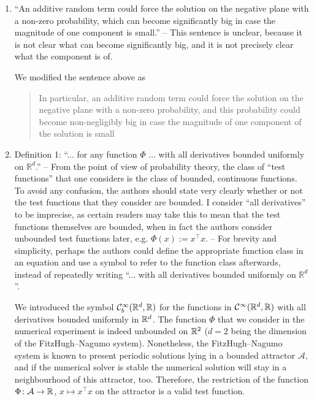 \documentclass[10pt]{article}
\begin{document}
\begin{enumerate}
	\item 
	\begin{itquote} 
		{\normalfont [Page 3]} ``An additive random term could force the solution on the negative plane with a non-zero probability, which can become significantly big in case the magnitude of one component is small.'' -- This sentence is unclear, because it is not clear what can become significantly big, and it is not precisely clear what the component is of.
	\end{itquote}
	We modified the sentence above as 
	\begin{quote} In particular, an additive random term could force the solution on the negative plane with a non-zero probability, and this probability could become non-negligibly big in case the magnitude of one component of the solution is small \end{quote}
	\item 
	\begin{itquote} 
		Definition 1: ``... for any function $\Phi$ ... with all derivatives bounded uniformly on $\mathbb{R}^d$.'' -- From the point of view of probability theory, the class of ``test functions'' that one considers is the class of bounded, continuous functions. To avoid any confusion, the authors should state very clearly whether or not the test functions that they consider are bounded. I consider ``all derivatives'' to be imprecise, as certain readers may take this to mean that the test functions themselves are bounded, when in fact the authors consider unbounded test functions later, e.g. $\Phi(x):=x^\top x$. -- For brevity and simplicity, perhaps the authors could define the appropriate function class in an equation and use a symbol to refer to the function class afterwards, instead of repeatedly writing ``... with all derivatives bounded uniformly on $\mathbb{R}^d$''.
	\end{itquote}
	We introduced the symbol $\mathcal C^\infty_b(\mathbb{R}^d, \mathbb{R})$ for the functions in $\mathcal C^\infty(\mathbb{R}^d, \mathbb{R})$ with all derivatives bounded uniformly in $\mathbb{R}^d$. The function $\Phi$ that we consider in the numerical experiment is indeed unbounded on $\mathbb{R}^2$ ($d = 2$ being the dimension of the FitzHugh--Nagumo system). Nonetheless, the FitzHugh--Nagumo system is known to present periodic solutions lying in a bounded attractor $\mathcal A$, and if the numerical solver is stable the numerical solution will stay in a neighbourhood of this attractor, too. Therefore, the restriction of the function $\Phi\colon \mathcal A \to \mathbb{R}$, $x \mapsto x^\top x$ on the attractor is a valid test function.

\end{enumerate}
\end{document}
